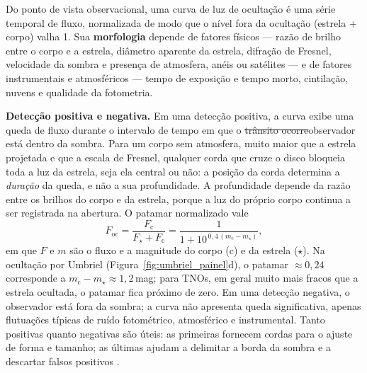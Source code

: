 \documentclass[msc]{on} %
\makeatletter
\providecommand{\DIFaddtex}[1]{{\protect\color{red}#1}} %
\providecommand{\DIFdeltex}[1]{{\protect\color{red}\sout{#1}}} %
\providecommand{\DIFaddbegin}{} %
\providecommand{\DIFaddend}{} %
\providecommand{\DIFdelbegin}{} %
\providecommand{\DIFdelend}{} %
\providecommand{\DIFadd}[1]{\texorpdfstring{\DIFaddtex{#1}}{#1}} %
\providecommand{\DIFdel}[1]{\texorpdfstring{\DIFdeltex{#1}}{}} %
\let\sout@orig\sout %
\renewcommand{\sout}[1]{\ifmmode\text{\sout@orig{\ensuremath{#1}}}\else\sout@orig{#1}\fi} %
\makeatother
\begin{document}
Do ponto de vista observacional, uma curva de luz de ocultação é uma série temporal de fluxo, normalizada de modo que o nível fora da ocultação (estrela + corpo) valha 1. Sua \textbf{morfologia} depende de fatores físicos --- razão de brilho entre o corpo e a estrela, diâmetro aparente da estrela, difração de Fresnel, velocidade da sombra e presença de atmosfera, anéis ou satélites --- e de fatores instrumentais e atmosféricos --- tempo de exposição e tempo morto, cintilação, nuvens e qualidade da fotometria.

\textbf{Detecção positiva e negativa.} Em uma detecção positiva, a curva exibe uma queda de fluxo durante o intervalo de tempo em que o \DIFdelbegin \DIFdel{trânsito ocorre}\DIFdelend\ifhmode\hskip0pt\fi \DIFaddbegin \DIFadd{observador está dentro da sombra}\DIFaddend . Para um corpo sem atmosfera, muito maior que a estrela projetada e que a escala de Fresnel, qualquer corda que cruze o disco bloqueia toda a luz da estrela, seja ela central ou não: a posição da corda determina a \emph{duração} da queda, e não a sua profundidade. A profundidade depende da razão entre os brilhos do corpo e da estrela, porque a luz do próprio corpo continua a ser registrada na abertura. O patamar normalizado vale
\[
F_{\mathrm{oc}} = \frac{F_{\mathrm{c}}}{F_{\star}+F_{\mathrm{c}}} = \frac{1}{1+10^{\,0{,}4\,(m_{\mathrm{c}}-m_{\star})}},
\]
em que \(F\) e \(m\) são o fluxo e a magnitude do corpo (c) e da estrela (\(\star\)). Na ocultação por Umbriel (Figura~\ref{fig:umbriel_painel}d), o patamar \(\approx 0{,}24\) corresponde a \(m_{\mathrm{c}}-m_{\star} \approx 1{,}2\)\,mag; para TNOs, em geral muito mais fracos que a estrela ocultada, o patamar fica próximo de zero. Em uma detecção negativa, o observador está fora da sombra; a curva não apresenta queda significativa, apenas flutuações típicas de ruído fotométrico, atmosférico e instrumental. Tanto positivas quanto negativas são úteis: as primeiras fornecem cordas para o ajuste de forma e tamanho; as últimas ajudam a delimitar a borda da sombra e a descartar falsos positivos \citep{SORA2022}.
\end{document}
